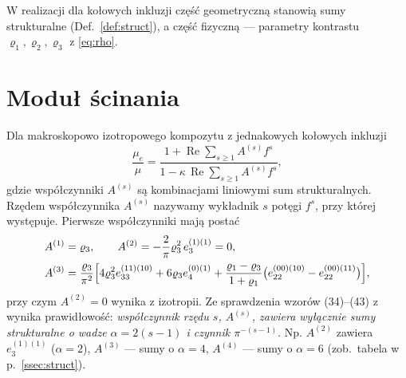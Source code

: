 \documentclass[12pt,a4paper,twoside,openright]{report}
\theoremstyle{definition}
\theoremstyle{remark}
\renewcommand{\Re}{\operatorname{Re}}
\begin{document}
W realizacji dla kołowych inkluzji część geometryczną stanowią sumy strukturalne (Def.~\ref{def:struct}), a część fizyczną --- parametry kontrastu $\varrho_1,\varrho_2,\varrho_3$ z \eqref{eq:rho}.

\section{Moduł ścinania}

Dla makroskopowo izotropowego kompozytu z jednakowych kołowych inkluzji \cite{czapla2025computational,drygas2019applied}
\begin{equation}\label{eq:mue31}
\frac{\mu_e}{\mu}=\frac{1+\Re\sum_{s\ge1}A^{(s)}f^s}{1-\kappa\,\Re\sum_{s\ge1}A^{(s)}f^s},
\end{equation}
gdzie współczynniki $A^{(s)}$ są kombinacjami liniowymi sum strukturalnych. Rzędem współczynnika $A^{(s)}$ nazywamy wykładnik $s$ potęgi $f^s$, przy której występuje. Pierwsze współczynniki mają postać
\begin{align}
A^{(1)}&=\varrho_3,\qquad A^{(2)}=-\frac2\pi\varrho_3^2\,e_3^{(1)(1)}=0,\label{eq:A12}\\
A^{(3)}&=\frac{\varrho_3}{\pi^2}\Bigl[4\varrho_3^2e_{33}^{(11)(10)}+6\varrho_3e_4^{(0)(1)}+\frac{\varrho_1-\varrho_3}{1+\varrho_1}\bigl(e_{22}^{(00)(10)}-e_{22}^{(00)(11)}\bigr)\Bigr],\label{eq:A3}
\end{align}
przy czym $A^{(2)}=0$ wynika z izotropii. Ze sprawdzenia wzorów (34)--(43) z \cite{czapla2025computational} wynika prawidłowość: \emph{współczynnik rzędu $s$, $A^{(s)}$, zawiera wyłącznie sumy strukturalne o wadze $\alpha=2(s-1)$ i czynnik $\pi^{-(s-1)}$}. Np. $A^{(2)}$ zawiera $e_3^{(1)(1)}$ ($\alpha=2$), $A^{(3)}$ --- sumy o $\alpha=4$, $A^{(4)}$ --- sumy o $\alpha=6$ (zob.~tabela w p.~\ref{ssec:struct}).
\end{document}
